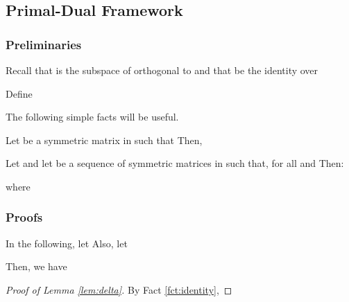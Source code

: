 \documentclass[twoside,leqno,twocolumn]{article}
\numberwithin{equation}{section}
\begin{document}
\subsection{Primal-Dual Framework}\label{app:ak}

\subsubsection{Preliminaries}
Recall that  is the subspace of  orthogonal to  and that  be the identity over 

Define 


The following simple facts will be useful.
\begin{fact}\label{fct:exp}
Let  be a symmetric matrix in  such that  Then, 
\end{fact}

\begin{theorem}\label{thm:expo}
Let  and let  be a sequence of symmetric matrices in  such that, for all   and 
Then:

where 
\end{theorem}

\begin{comment}
\begin{proof}
Let 
Notice:

By the Golden-Thompson Inequality we have:

Moreover, by Fact \ref{fct:exp}

Hence,

Iterating this argument over  we obtain:

\end{proof}
By taking logs this implies:

Finally, using the fact that  yields the required result.
\end{comment}
\subsubsection{Proofs}

 In the following, let  Also, let

Then,  we have 


\begin{proof}[Proof of Lemma \ref{lem:delta}]
By Fact \ref{fct:identity},

\end{proof}
              
\end{document}
